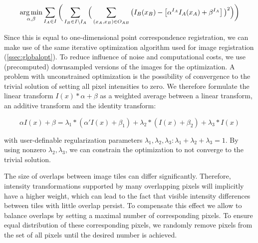 \begin{equation}
\label{eq:brighness-adjust-1}
\operatorname*{arg\,min}_{\alpha, \beta} \sum_{I_A  \in I}  \bigg( \sum_{I_B \in I \setminus I_A} \Big( \sum_{(x_A, x_B) \in O_{AB}} \big( I_B(x_B) - \left[ \alpha^{I_A} I_A(x_A) + \beta^{I_A} \right] \big)^2 \Big)\bigg)
\end{equation}

Since this is equal to one-dimensional point correspondence registration, we can make use of the same iterative optimization algorithm used for image registration (\ref{ssec:globalopt}). To reduce influence of noise and computational costs, we use (precomputed) downsampled versions of the images for the optimization. A problem with unconstrained optimization is the possibility of convergence to the trivial solution of setting all pixel intensities to zero. We therefore formulate the linear transform $I(x)*\alpha + \beta$ as a weighted average between a linear transform, an additive transform and the identity transform:

\begin{equation}
\label{eq:brighness-adjust-2}
\alpha I(x) + \beta = \lambda_1 * (\alpha' I(x) + \beta_1) + \lambda_2 * (I(x) + \beta_2) + \lambda_3 * I(x) 
\end{equation}

with user-definable regularization parameters $\lambda_1, \lambda_2, \lambda_3: \lambda_1+ \lambda_2+\lambda_3 = 1$. By using nonzero $\lambda_2, \lambda_3$, we can constrain the optimization to not converge to the trivial solution.

The size of overlaps between image tiles can differ significantly. Therefore, intensity transformations supported by many overlapping pixels will implicitly have a higher weight, which can lead to the fact that visible intensity differences between tiles with little overlap persist. To compensate this effect we allow to balance overlaps by setting a maximal number of corresponding pixels. To ensure equal distribution of these corresponding pixels, we randomly remove pixels from the set of all pixels until the desired number is achieved.

